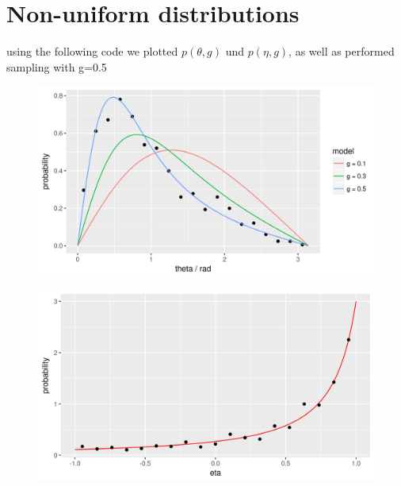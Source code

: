 \section{Non-uniform distributions}
using the following code we plotted $p(\theta,g)$ und $p(\eta,g)$, as well as performed sampling with g=0.5

\begin{figure}[H]
	
\end{figure}
\begin{figure}[H]
    \includegraphics[]{6-2_scatter_prob_b}
\end{figure}
\begin{figure}[H]
    \includegraphics[]{6-2_scatter_eta_b}
\end{figure}